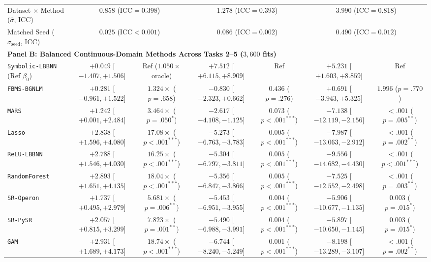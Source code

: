 \documentclass[11pt,a4paper]{article}
\begin{document}
\begin{table}[t!]
{\begin{tabular}{lcccccc}
Dataset $\times$ Method ($\hat{\sigma}$, $\mathrm{ICC}$) & \multicolumn{2}{c}{$0.858$ ($\mathrm{ICC} = 0.398$)} & \multicolumn{2}{c}{$1.278$ ($\mathrm{ICC} = 0.393$)} & \multicolumn{2}{c}{$3.990$ ($\mathrm{ICC} = 0.818$)} \\
Matched Seed ($\hat{\sigma}_{\text{seed}}$, $\mathrm{ICC}$) & \multicolumn{2}{c}{$0.025$ ($\mathrm{ICC} < 0.001$)} & \multicolumn{2}{c}{$0.086$ ($\mathrm{ICC} = 0.002$)} & \multicolumn{2}{c}{$0.490$ ($\mathrm{ICC} = 0.012$)} \\
\midrule
\multicolumn{7}{l}{\textbf{Panel B: Balanced Continuous-Domain Methods Across Tasks 2--5 ($3{,}600$ fits)}} \\
\texttt{Symbolic-LBBNN} (Ref $\beta_0$) & $+0.049$ [$-1.407, +1.506$] & Ref ($1.050\times$ oracle) & $+7.512$ [$+6.115, +8.909$] & Ref & $+5.231$ [$+1.603, +8.859$] & Ref \\
\texttt{FBMS-BGNLM} & $+0.281$ [$-0.961, +1.522$] & $1.324\times$ ($p = .658$) & $-0.830$ [$-2.323, +0.662$] & $0.436$ ($p = .276$) & $+0.691$ [$-3.943, +5.325$] & $1.996$ ($p = .770$) \\
\texttt{MARS} & $+1.242$ [$+0.001, +2.484$] & $3.464\times$ ($p = .050^{*}$) & $-2.617$ [$-4.108, -1.125$] & $0.073$ ($p < .001^{***}$) & $-7.138$ [$-12.119, -2.156$] & $<.001$ ($p = .005^{**}$) \\
\texttt{Lasso} & $+2.838$ [$+1.596, +4.080$] & $17.08\times$ ($p < .001^{***}$) & $-5.273$ [$-6.763, -3.783$] & $0.005$ ($p < .001^{***}$) & $-7.987$ [$-13.063, -2.912$] & $<.001$ ($p = .002^{**}$) \\
\texttt{ReLU-LBBNN} & $+2.788$ [$+1.546, +4.030$] & $16.25\times$ ($p < .001^{***}$) & $-5.304$ [$-6.797, -3.811$] & $0.005$ ($p < .001^{***}$) & $-9.556$ [$-14.682, -4.430$] & $<.001$ ($p < .001^{***}$) \\
\texttt{RandomForest} & $+2.893$ [$+1.651, +4.135$] & $18.04\times$ ($p < .001^{***}$) & $-5.356$ [$-6.847, -3.866$] & $0.005$ ($p < .001^{***}$) & $-7.525$ [$-12.552, -2.498$] & $<.001$ ($p = .003^{**}$) \\
\texttt{SR-Operon} & $+1.737$ [$+0.495, +2.979$] & $5.681\times$ ($p = .006^{**}$) & $-5.453$ [$-6.951, -3.955$] & $0.004$ ($p < .001^{***}$) & $-5.906$ [$-10.677, -1.135$] & $0.003$ ($p = .015^{*}$) \\
\texttt{SR-PySR} & $+2.057$ [$+0.815, +3.299$] & $7.823\times$ ($p = .001^{**}$) & $-5.490$ [$-6.988, -3.991$] & $0.004$ ($p < .001^{***}$) & $-5.897$ [$-10.650, -1.145$] & $0.003$ ($p = .015^{*}$) \\
\texttt{GAM} & $+2.931$ [$+1.689, +4.173$] & $18.74\times$ ($p < .001^{***}$) & $-6.744$ [$-8.240, -5.249$] & $0.001$ ($p < .001^{***}$) & $-8.198$ [$-13.289, -3.107$] & $<.001$ ($p = .002^{**}$) \\

\end{tabular}}
\end{table}
\end{document}
